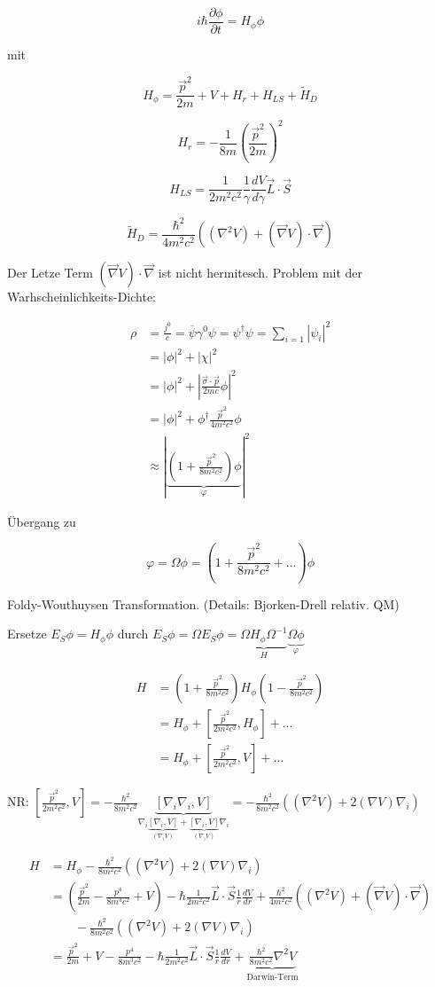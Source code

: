 \[i\hbar \frac{\partial \phi}{\partial t} =  H_\phi \phi\]


mit 

\[H_\phi = \frac{\vec p^2}{2m}+V+H_r+H_{LS}+\tilde H_D\]

\[H_r = -\frac{1}{8m}\left(\frac{\vec p^2}{2m}\right)^2\]

\[H_{LS} = \frac{1}{2m^2c^2}\frac{1}{\gamma}\frac{dV}{d\gamma}\vec L\cdot\vec S\]

\[\tilde H_D = \frac{\hbar^2}{4m^2c^2}((\nabla^2V)+(\vec\nabla V)\cdot\vec\nabla)\]

Der Letze Term \((\vec\nabla V)\cdot\vec\nabla\) ist nicht hermitesch. Problem mit der Warhscheinlichkeits-Dichte:

\begin{align}
\rho &= \frac{j^0}{c}=\overline \psi\gamma^0\psi = \psi^\dagger\psi = \sum_{i=1}|\psi_i|^2\\
&=|\phi|^2 + |\chi|^2\\
&=|\phi|^2+|\frac{\vec\sigma\cdot\vec p}{2mc}\phi|^2\\
&=|\phi|^2+\phi^\dagger \frac{\vec p^2}{4m^2c^2}\phi \\
&\approx |\underbrace{(1+\frac{\vec p^2}{8m^2c^2})\phi}_{\varphi}|^2
\end{align}

Übergang zu 

\[\varphi = \Omega\phi = (1+\frac{\vec p^2}{8m^2c^2}+...)\phi\]

Foldy-Wouthuysen Transformation. (Details: Bjorken-Drell relativ. QM)


Ersetze \(E_S\phi = H_\phi \phi\) durch \(E_S\phi =\Omega E_S\phi = \underbrace{\Omega H_\phi\Omega^{-1}}_{H}\underbrace{\Omega\phi}_{\varphi}\)

\begin{align}
H&=(1+\frac{\vec p^2}{8m^2c^2})H_\phi (1-\frac{\vec p^2}{8m^2c^2}) \\
&=H_\phi + [\frac{\vec p^2}{2m^2c^2},H_\phi]+...\\
&=H_\phi + [\frac{\vec p^2}{2m^2c^2},V]+...
\end{align}

NR: \([\frac{\vec p^2}{2m^2c^2},V]=-\frac{\hbar^2}{8m^2c^2}\underbrace{[\nabla_i\nabla_i,V]}_{\nabla_i\underbrace{[\nabla_i,V]}_{(\nabla_iV)}+\underbrace{[\nabla_i,V]}_{(\nabla_iV)}\nabla_i} =-\frac{\hbar^2}{8m^2c^2} ((\nabla^2 V)+2(\nabla V)\nabla_i)\)

\begin{align}
H&=H_\phi -\frac{\hbar^2}{8m^2c^2} ((\nabla^2 V)+2(\nabla V)\nabla_i)\\
&=( \frac{\vec p^2}{2m} - \frac{p^4}{8m^3c^2}+V) - \hbar \frac{1}{2m^2c^2}\vec L\cdot\vec S\frac{1}{r}\frac{dV}{dr} + \frac{\hbar^2}{4m^2c^2}\left((\nabla^2 V)+(\vec\nabla V)\cdot\vec\nabla  \right)\\
&\qquad -\frac{\hbar^2}{8m^2c^2} ((\nabla^2 V)+2(\nabla V)\nabla_i)\\
&=\frac{\vec p^2}{2m}+V - \frac{p^4}{8m^3c^2} - \hbar \frac{1}{2m^2c^2}\vec L\cdot\vec S\frac{1}{r}\frac{dV}{dr} + \underbrace{\frac{\hbar^2}{8m^2c^2}\nabla^2 V}_{\text{Darwin-Term}}
\end{align}



